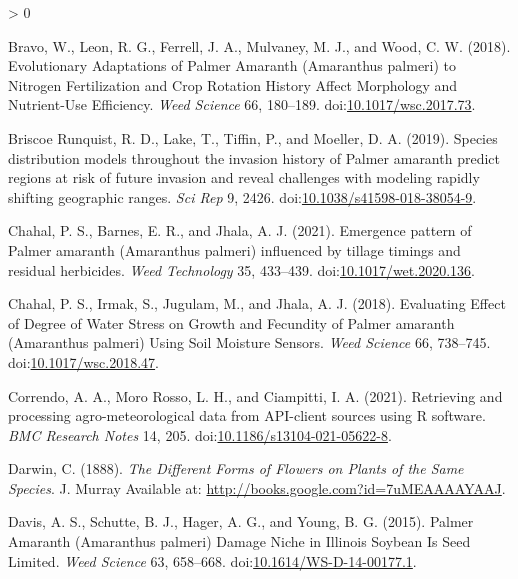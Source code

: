 \documentclass[utf8]{frontiersSCNS}
\newlength{\cslhangindent}
\newenvironment{CSLReferences}[2] %
 {%
  \setlength{\parindent}{0pt}
  \ifodd #1 \everypar{\setlength{\hangindent}{\cslhangindent}}\ignorespaces\fi
  \ifnum #2 > 0
  \setlength{\parskip}{#2\baselineskip}
  \fi
 }%
 {}
\begin{document}
\begin{CSLReferences}{1}{0}
\leavevmode\hypertarget{ref-bravo2018}{}%
Bravo, W., Leon, R. G., Ferrell, J. A., Mulvaney, M. J., and Wood, C. W.
(2018). Evolutionary {Adaptations} of {Palmer Amaranth} ({Amaranthus}
palmeri) to {Nitrogen Fertilization} and {Crop Rotation History Affect
Morphology} and {Nutrient}-{Use Efficiency}. \emph{Weed Science} 66,
180--189.
doi:\href{https://doi.org/10.1017/wsc.2017.73}{10.1017/wsc.2017.73}.

\leavevmode\hypertarget{ref-briscoerunquist2019}{}%
Briscoe Runquist, R. D., Lake, T., Tiffin, P., and Moeller, D. A.
(2019). Species distribution models throughout the invasion history of
{Palmer} amaranth predict regions at risk of future invasion and reveal
challenges with modeling rapidly shifting geographic ranges. \emph{Sci
Rep} 9, 2426.
doi:\href{https://doi.org/10.1038/s41598-018-38054-9}{10.1038/s41598-018-38054-9}.

\leavevmode\hypertarget{ref-chahal2021}{}%
Chahal, P. S., Barnes, E. R., and Jhala, A. J. (2021). Emergence pattern
of {Palmer} amaranth ({Amaranthus} palmeri) influenced by tillage
timings and residual herbicides. \emph{Weed Technology} 35, 433--439.
doi:\href{https://doi.org/10.1017/wet.2020.136}{10.1017/wet.2020.136}.

\leavevmode\hypertarget{ref-chahal2018}{}%
Chahal, P. S., Irmak, S., Jugulam, M., and Jhala, A. J. (2018).
Evaluating {Effect} of {Degree} of {Water Stress} on {Growth} and
{Fecundity} of {Palmer} amaranth ({Amaranthus} palmeri) {Using Soil
Moisture Sensors}. \emph{Weed Science} 66, 738--745.
doi:\href{https://doi.org/10.1017/wsc.2018.47}{10.1017/wsc.2018.47}.

\leavevmode\hypertarget{ref-correndo2021}{}%
Correndo, A. A., Moro Rosso, L. H., and Ciampitti, I. A. (2021).
Retrieving and processing agro-meteorological data from {API}-client
sources using {R} software. \emph{BMC Research Notes} 14, 205.
doi:\href{https://doi.org/10.1186/s13104-021-05622-8}{10.1186/s13104-021-05622-8}.

\leavevmode\hypertarget{ref-darwin1888}{}%
Darwin, C. (1888). \emph{The {Different Forms} of {Flowers} on {Plants}
of the {Same Species}}. {J. Murray} Available at:
\url{http://books.google.com?id=7uMEAAAAYAAJ}.

\leavevmode\hypertarget{ref-davis2015}{}%
Davis, A. S., Schutte, B. J., Hager, A. G., and Young, B. G. (2015).
Palmer {Amaranth} ({Amaranthus} palmeri) {Damage Niche} in {Illinois
Soybean Is Seed Limited}. \emph{Weed Science} 63, 658--668.
doi:\href{https://doi.org/10.1614/WS-D-14-00177.1}{10.1614/WS-D-14-00177.1}.


\end{CSLReferences}
\end{document}
